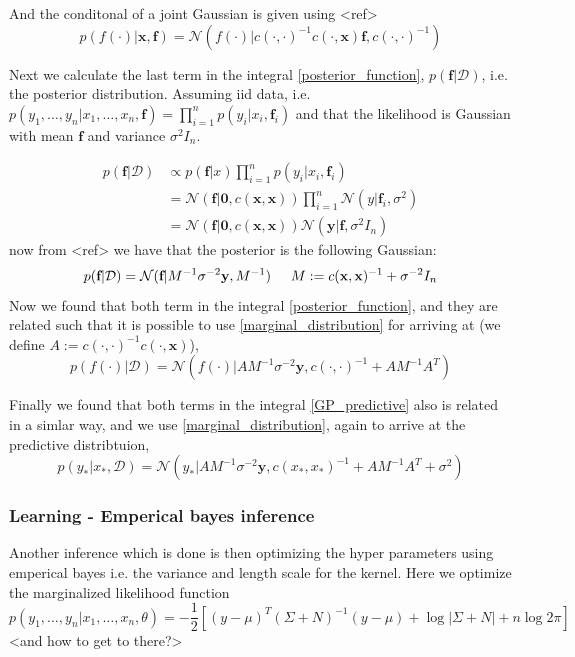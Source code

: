 And the conditonal of a joint Gaussian is given using <ref> 
$$p(f(\cdot)|\textbf{x}, \textbf{f}) = \mathcal{N}(f(\cdot)|c(\cdot, \cdot)^{-1}c(\cdot, \textbf{x})\textbf{f}, c(\cdot, \cdot)^{-1})$$

Next we calculate the last term in the integral \eqref{posterior_function}, 
$p(\textbf{f}|\mathcal{D})$, i.e. the posterior distribution. Assuming iid data, 
i.e. $p(y_1,\dots, y_n|x_1,\dots, x_n, \textbf{f}) = \prod_{i=1}^n p(y_i|x_i,\textbf{f}_i)$
and that the likelihood is Gaussian with mean $\textbf{f}$ and variance $\sigma^2 I_n$. 

\begin{align*}
    p(\textbf{f}|\mathcal{D}) &\propto p(\textbf{f}|x)\prod_{i=1}^n p(y_i|x_i,\textbf{f}_i)\\
    &= \mathcal{N}(\textbf{f}|\textbf{0},c(\textbf{x}, \textbf{x})) \prod_{i=1}^n \mathcal{N}(y|\textbf{f}_i,\sigma^2)\\
    &= \mathcal{N}(\textbf{f}|\textbf{0}, c(\textbf{x}, \textbf{x})) \mathcal{N}(\textbf{y}|\textbf{f},\sigma^2 I_n)
\end{align*}
now from <ref> we have that the posterior is the following Gaussian: 
\begin{equation*}
    p(\textbf{f}|\mathcal{D}) = \mathcal{N}(\textbf{f}|M^{-1} \sigma^{-2}\textbf{y}, M^{-1}) \hspace{0.5cm}M := c(\textbf{x}, \textbf{x})^{-1}+\sigma^{-2} I_n
\end{equation*}
Now we found that both term in the integral \eqref{posterior_function}, and they
are related such that it is possible to use \eqref{marginal_distribution} for arriving 
at (we define $A :=  c(\cdot, \cdot)^{-1} c(\cdot, \textbf{x})$), 
$$p(f(\cdot)|\mathcal{D}) = \mathcal{N}(f(\cdot)|AM^{-1}\sigma^{-2}\textbf{y}, c(\cdot, \cdot)^{-1}+
AM^{-1}A^T)$$

Finally we found that both terms in the integral \eqref{GP_predictive} also is related
in a simlar way, and we use \eqref{marginal_distribution}, again to arrive at the predictive
distribtuion, 
$$p(y_*|x_*,\mathcal{D}) = \mathcal{N}(y_*|AM^{-1}\sigma^{-2}\textbf{y}, c(x_*, x_*)^{-1}+
AM^{-1}A^T+\sigma^2)$$

\subsubsection*{Learning - Emperical bayes inference}

Another inference which is done is then optimizing the hyper parameters using emperical bayes i.e.
the variance and length scale for the kernel. Here we optimize the marginalized likelihood function
$$p(y_1, \dots, y_n|x_1, \dots, x_n, \theta) = -\frac{1}{2}[(y-\mu)^T (\Sigma+N)^{-1}(y-\mu)+ \log |\Sigma+N|+n \log 2\pi]$$
<and how to get to there?>


